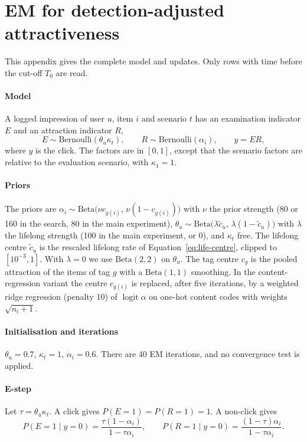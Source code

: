 \documentclass[preprint,12pt,authoryear]{elsarticle}
\begin{document}
\section{EM for detection-adjusted attractiveness}\label{app:em}

This appendix gives the complete model and updates. Only rows with time before the cut-off $T_0$ are read.

\paragraph{Model} A logged impression of user $u$, item $i$ and scenario $t$ has an examination indicator $E$ and an attraction indicator $R$,
\[
E\sim\mathrm{Bernoulli}(\theta_u\kappa_t),\qquad R\sim\mathrm{Bernoulli}(\alpha_i),\qquad y=ER,
\]
where $y$ is the click. The factors are in $[0,1]$, except that the scenario factors are relative to the evaluation scenario, with $\kappa_1=1$.

\paragraph{Priors} The priors are $\alpha_i\sim\mathrm{Beta}\bigl(\nu c_{g(i)},\,\nu(1-c_{g(i)})\bigr)$ with $\nu$ the prior strength (80 or 160 in the search,
80 in the main experiment), $\theta_u\sim\mathrm{Beta}\bigl(\lambda\tilde c_u,\,\lambda(1-\tilde c_u)\bigr)$ with $\lambda$ the lifelong strength (100 in the
main experiment, or 0), and $\kappa_t$ free. The lifelong centre $\tilde c_u$ is the rescaled lifelong rate of Equation~\eqref{eq:life-centre}, clipped
to $[10^{-3},1]$. With $\lambda=0$ we use $\mathrm{Beta}(2,2)$ on $\theta_u$. The tag centre $c_g$ is the pooled attraction of the items of tag $g$ with
a $\mathrm{Beta}(1,1)$ smoothing. In the content-regression variant the centre $c_{g(i)}$ is replaced, after five iterations, by a weighted ridge
regression (penalty 10) of $\operatorname{logit}\alpha$ on one-hot content codes with weights $\sqrt{n_i+1}$.

\paragraph{Initialisation and iterations} $\theta_u=0.7$, $\kappa_t=1$, $\alpha_i=0.6$. There are 40 EM iterations, and no convergence test is applied.

\paragraph{E-step} Let $\tau=\theta_u\kappa_t$. A click gives $P(E=1)=P(R=1)=1$. A non-click gives
\[
P(E=1\mid y=0)=\frac{\tau(1-\alpha_i)}{1-\tau\alpha_i},\qquad
P(R=1\mid y=0)=\frac{(1-\tau)\alpha_i}{1-\tau\alpha_i}.
\]
\end{document}
